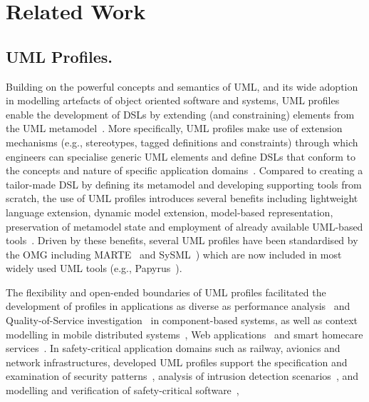 \section{Related Work} 
\label{sec:related}

\subsection{UML Profiles.}
Building on the powerful concepts and semantics of UML, and its wide adoption in modelling artefacts of object oriented software and systems, UML profiles enable the development of DSLs by extending (and constraining) elements from the UML metamodel~\cite{FuentesFernandez2004:UMLME}. 
More specifically, UML profiles make use of extension mechanisms (e.g., stereotypes, tagged definitions and constraints) through which engineers can 
specialise generic UML elements and define DSLs that conform to the concepts and nature of specific application domains~\cite{Selic2007:ISORC}. 
Compared to creating a tailor-made DSL by defining its metamodel and developing supporting tools from scratch, the use of UML profiles introduces several benefits including lightweight language extension, dynamic model extension, model-based representation, preservation of metamodel state and employment of already available UML-based tools~\cite{langer2011uml}. 
Driven by these benefits, several UML profiles have been standardised by the OMG including MARTE~\cite{omg2011marte} and SySML~\cite{friedenthal2014practical}) which are now included in most widely used UML tools (e.g., Papyrus~\cite{lanusse2009papyrus}). 

The flexibility and open-ended boundaries of UML profiles facilitated the development of profiles in applications as diverse as performance analysis~\cite{xu2003performance} and Quality-of-Service investigation~\cite{cortellessa2004towards} in component-based systems, as well as context modelling in mobile distributed systems~\cite{Simons2007:JVLC},  Web applications~\cite{Moreno2007:IETS} and smart homecare services~\cite{Walderhaug2009:MODELS}. In safety-critical application domains
such as railway, avionics and network infrastructures, developed UML profiles support the specification and examination of security patterns~\cite{Bouaziz2012:ICCSE,Rodriguez2010:SERENE}, analysis of intrusion detection scenarios~\cite{hussein2006umlintr}, and modelling and verification of safety-critical software~\cite{Bernardi2013:JRESS,zoughbi2007uml}, 

